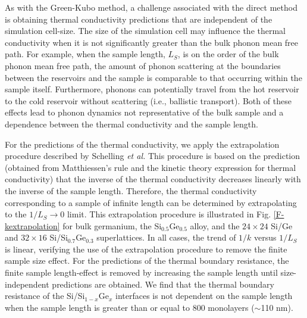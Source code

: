 \documentclass[letterpaper,12pt]{article}
\begin{document}

As with the Green-Kubo method, a challenge associated with the
direct method is obtaining thermal conductivity predictions that are
independent of the simulation cell-size. The size of the simulation
cell may influence the thermal conductivity when it is not
significantly greater than the bulk phonon mean free path. For
example, when the sample length, $L_S$, is on the order of the bulk
phonon mean free path, the amount of phonon scattering at the
boundaries between the reservoirs and the sample is comparable to
that occurring within the sample itself. Furthermore, phonons can
potentially travel from the hot reservoir to the cold reservoir
without scattering (i.e., ballistic transport). Both of these
effects lead to phonon dynamics not representative of the bulk
sample and a dependence between the thermal conductivity and the
sample length.

For the predictions of the thermal conductivity, we apply the
extrapolation procedure described by Schelling \textit{et
al.}\cite{schelling2002} This procedure is based on the prediction
(obtained from Matthiessen's rule and the kinetic theory expression
for thermal conductivity) that the inverse of the thermal
conductivity decreases linearly with the inverse of the sample
length. Therefore, the thermal conductivity corresponding to a
sample of infinite length can be determined by extrapolating to the
$1/L_S \rightarrow 0$ limit. This extrapolation procedure is
illustrated in Fig$.$ \ref{F-kextrapolation} for bulk germanium, the
Si$_{0.5}$Ge$_{0.5}$ alloy, and the $24\times24$ Si/Ge and
$32\times16$ Si/Si$_{0.7}$Ge$_{0.3}$ superlattices. In all cases,
the trend of $1/k$ versus $1/L_S$ is linear, verifying the use of
the extrapolation procedure to remove the finite sample size effect.
For the predictions of the thermal boundary resistance, the finite
sample length-effect is removed by increasing the sample length
until size-independent predictions are obtained. We find that the
thermal boundary resistance of the Si/Si$_{1-x}$Ge$_x$ interfaces is
not dependent on the sample length when the sample length is greater
than or equal to 800 monolayers ($\sim$110 nm).
\end{document}
